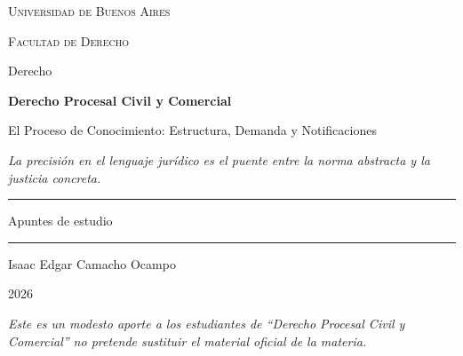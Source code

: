 \documentclass[12pt,oneside]{book}
\newcommand{\universidad}{Facultad de Derecho}
\newcommand{\facultad}{Universidad de Buenos Aires}
\newcommand{\carrera}{Derecho}
\newcommand{\materia}{Derecho Procesal Civil y Comercial}
\newcommand{\titulo}{El Proceso de Conocimiento: Estructura, Demanda y Notificaciones}
\newcommand{\autor}{Isaac Edgar Camacho Ocampo}
\newcommand{\anio}{2026}
\begin{document}

\begin{titlepage}

\thispagestyle{empty}

\begin{center}

\vspace*{1cm}

{\large \textsc{\facultad}}

\vspace{0.2cm}

{\large \textsc{\universidad}}

\vspace{0.2cm}

{\large \carrera}

\vspace{3cm}

{\Huge \textbf{\materia}}

\vspace{1cm}

{\LARGE \titulo}

\vspace{0.8cm}

\textit{La precisión en el lenguaje jurídico es el puente entre la norma abstracta y la justicia concreta.}

\vspace{1.2cm}

\rule{0.70\textwidth}{0.5pt}

\vspace{0.5cm}

{\large Apuntes de estudio}

\vspace{0.5cm}

\rule{0.70\textwidth}{0.5pt}

\vfill

{\large \autor}

\vspace{0.3cm}

{\large \anio}

\end{center}

\vfill

\begin{flushleft}
\textit{Este es un modesto aporte a los estudiantes de ``Derecho Procesal Civil y Comercial'' no pretende sustituir el material oficial de la materia.}
\end{flushleft}

\end{titlepage}
\end{document}
